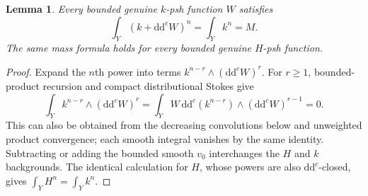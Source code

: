 \documentclass[11pt]{article}
\newtheorem{lemma}[theorem]{Lemma}
\newcommand{\ddc}{\mathrm{d}\mathrm{d}^c}
\begin{document}
\begin{lemma}\label{lem:mass}
Every bounded genuine $k$-psh function $W$ satisfies
\[
 \int_Y(k+\ddc W)^n=\int_Yk^n=M.
\]
The same mass formula holds for every bounded genuine $H$-psh function.
\end{lemma}
\begin{proof}
Expand the $n$th power into terms $k^{n-r}\wedge(\ddc W)^r$.
For $r\ge1$, bounded-product recursion and compact distributional
Stokes give
\[
 \int_Yk^{n-r}\wedge(\ddc W)^r
 =\int_Y W\,\ddc(k^{n-r})\wedge(\ddc W)^{r-1}=0.
\]
This can also be obtained from the decreasing convolutions below and
unweighted product convergence; each smooth integral vanishes by the
same identity. Subtracting or adding the bounded smooth $v_0$
interchanges the $H$ and $k$ backgrounds. The identical calculation
for $H$, whose powers are also $\ddc$-closed, gives
$\int_YH^n=\int_Yk^n$.
\end{proof}
\end{document}
